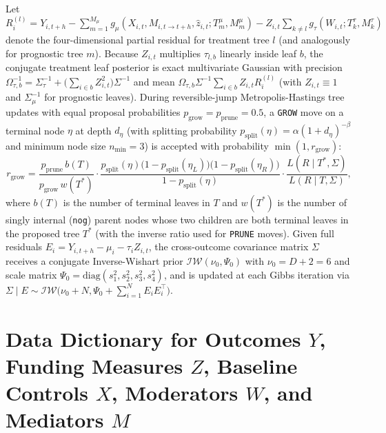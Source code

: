 \documentclass[11pt,a4paper]{article}
\begin{document}
Let $R^{(l)}_{i} = Y_{i,t+h} - \sum_{m=1}^{M_\mu} g_\mu(X_{i,t}, M_{i,t\to t+h}, \hat{z}_{i,t}; T^\mu_m, M^\mu_m) - Z_{i,t} \sum_{k \ne l} g_\tau(W_{i,t}; T^\tau_k, M^\tau_k)$ denote the four-dimensional partial residual for treatment tree $l$ (and analogously for prognostic tree $m$). Because $Z_{i,t}$ multiplies $\tau_{l,b}$ linearly inside leaf $b$, the conjugate treatment leaf posterior is exact multivariate Gaussian with precision $\Omega_{\tau, b}^{-1} = \Sigma_{\tau}^{-1} + \bigl(\sum_{i \in b} Z_{i,t}^2\bigr)\Sigma^{-1}$ and mean $\Omega_{\tau, b} \Sigma^{-1} \sum_{i \in b} Z_{i,t} R^{(l)}_i$ (with $Z_{i,t} \equiv 1$ and $\Sigma_\mu^{-1}$ for prognostic leaves). During reversible-jump Metropolis-Hastings tree updates \citep{chipman2010bart} with equal proposal probabilities $p_{\text{grow}} = p_{\text{prune}} = 0.5$, a \texttt{GROW} move on a terminal node $\eta$ at depth $d_\eta$ (with splitting probability $p_{\text{split}}(\eta) = \alpha (1 + d_\eta)^{-\beta}$ and minimum node size $n_{\min} = 3$) is accepted with probability $\min(1, r_{\text{grow}})$:
\begin{equation}
  r_{\text{grow}} = \frac{p_{\text{prune}} \, b(T)}{p_{\text{grow}} \, w(T^*)} \cdot \frac{p_{\text{split}}(\eta)\bigl(1 - p_{\text{split}}(\eta_L)\bigr)\bigl(1 - p_{\text{split}}(\eta_R)\bigr)}{1 - p_{\text{split}}(\eta)} \cdot \frac{L(R \mid T^*, \Sigma)}{L(R \mid T, \Sigma)},
\end{equation}
where $b(T)$ is the number of terminal leaves in $T$ and $w(T^*)$ is the number of singly internal (\texttt{nog}) parent nodes whose two children are both terminal leaves in the proposed tree $T^*$ (with the inverse ratio used for \texttt{PRUNE} moves). Given full residuals $E_i = Y_{i,t+h} - \mu_i - \tau_i Z_{i,t}$, the cross-outcome covariance matrix $\Sigma$ receives a conjugate Inverse-Wishart prior $\mathcal{IW}(\nu_0, \Psi_0)$ with $\nu_0 = D + 2 = 6$ and scale matrix $\Psi_0 = \text{diag}(s_1^2, s_2^2, s_3^2, s_4^2)$, and is updated at each Gibbs iteration via $\Sigma \mid E \sim \mathcal{IW}\bigl(\nu_0 + N, \Psi_0 + \sum_{i=1}^N E_i E_i^\top\bigr)$.

\section{Data Dictionary for Outcomes \texorpdfstring{$Y$}{Y}, Funding Measures \texorpdfstring{$Z$}{Z}, Baseline Controls \texorpdfstring{$X$}{X}, Moderators \texorpdfstring{$W$}{W}, and Mediators \texorpdfstring{$M$}{M}}
\label{app:dictionary}
\end{document}
